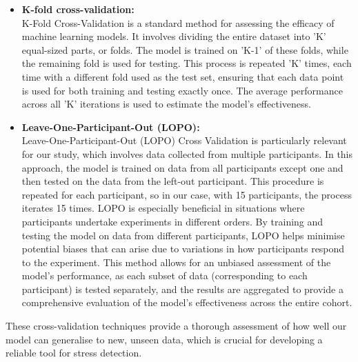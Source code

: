 \begin{itemize}
  \item \textbf{K-fold cross-validation:} \\
  K-Fold Cross-Validation is a standard method for assessing the efficacy of machine learning models. It involves dividing the entire dataset into 'K' equal-sized parts, or folds. The model is trained on 'K-1' of these folds, while the remaining fold is used for testing. This process is repeated 'K' times, each time with a different fold used as the test set, ensuring that each data point is used for both training and testing exactly once. The average performance across all 'K' iterations is used to estimate the model’s effectiveness.
  
  \item \textbf{Leave-One-Participant-Out (LOPO):} \\
  Leave-One-Participant-Out (LOPO) Cross Validation is particularly relevant for our study, which involves data collected from multiple participants. In this approach, the model is trained on data from all participants except one and then tested on the data from the left-out participant. This procedure is repeated for each participant, so in our case, with 15 participants, the process iterates 15 times. LOPO is especially beneficial in situations where participants undertake experiments in different orders. By training and testing the model on data from different participants, LOPO helps minimise potential biases that can arise due to variations in how participants respond to the experiment. This method allows for an unbiased assessment of the model's performance, as each subset of data (corresponding to each participant) is tested separately, and the results are aggregated to provide a comprehensive evaluation of the model’s effectiveness across the entire cohort.
\end{itemize}

These cross-validation techniques provide a thorough assessment of how well our model can generalise to new, unseen data, which is crucial for developing a reliable tool for stress detection.